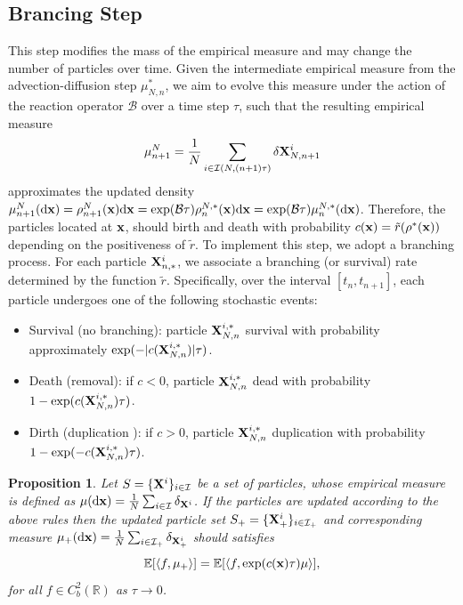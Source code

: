 \documentclass[12pt]{article}
\newtheorem{proposition}[theorem]{Proposition}
\begin{document}
\subsection{Brancing Step}
This step modifies the mass of the empirical measure and may change the number of particles over time. Given the intermediate empirical measure from the advection-diffusion step $\mu_{N,n}^*$, we aim to evolve this measure under the action of the reaction operator $\mathcal  B$ over a time step $\tau$, such that the resulting empirical measure
\begin{equation}
    \mu^N_{n+1} = \frac{1}{N} \sum_{i\in \mathcal I (N,(n+1)\tau)} \delta \mathbf{X}^i_{N,n+1}
\end{equation}
approximates the updated density $\mu^N_{n+1}(\mathrm{d} \mathbf{x} ) = \rho^N_{n+1}(\mathbf{x}) \mathrm{d} \mathbf{x} = \exp(\mathcal B\tau) \rho_{n}^{N,*}(\mathbf{x}) \mathrm{d} \mathbf{x} = \exp(\mathcal  B\tau) \mu_{n}^{N,*}(\mathrm{d} \mathbf{x})$. Therefore, the particles located at $\mathbf{x}$, should birth and death with probability $c(\mathbf{x})=\tilde r(\rho^*(\mathbf{x}))$ depending on the positiveness of $\tilde r$.
To implement this step, we adopt a branching process. For each particle $\mathbf{X}^i_{n,*}$, we associate a branching (or survival) rate determined by the function $\tilde r $. Specifically, over the interval $[t_n,t_{n+1}]$, each particle undergoes one of the following stochastic events:
\begin{itemize}
    \item Survival (no branching): particle $\mathbf{X}^{i,*}_{N,n}$ survival with probability approximately $\exp(-| c(\mathbf{X}^{i,*}_{N,n})|\tau)$.
    \item Death (removal): if $c<0 $, particle $\mathbf{X}^{i,*}_{N,n}$ dead  with probability $1-\exp( c(\mathbf{X}^{i,*}_{N,n})\tau)$.
    \item Dirth (duplication ): if $ c>0 $, particle $\mathbf{X}^{i,*}_{N,n}$ duplication  with probability $1-\exp(- c (\mathbf{X}^{i,*}_{N,n})\tau)$.
\end{itemize}
\begin{proposition}
    Let $S=\{\mathbf{X}^i\}_{i\in \mathcal I}$ be a set of particles, whose empirical measure is defined as $\mu (\mathrm{d} \mathbf{x}) = \frac{1}{N}\sum_{i\in \mathcal I }\delta_{\mathbf{X}^i}$. If the particles are updated according to the above rules then the updated particle set $S_+=\{ \mathbf{X}^i_+\}_{i\in {\mathcal I}_+}$ and corresponding  measure $ \mu_+ (\mathrm{d} \mathbf{x}) = \frac{1}{N}\sum_{i\in  {\mathcal  I}_+}\delta_{ \mathbf{X}^i_+}$ should satisfies 
    \begin{equation}
        \mathbb E [\left<f, \mu_+\right>] =  \mathbb E[  \left<f,\exp( c(\mathbf{x})\tau)\mu\right>],
    \end{equation}
    for all $f\in C^2_b(\mathbb R)$ as $\tau\to 0$.
\end{proposition}
\end{document}
